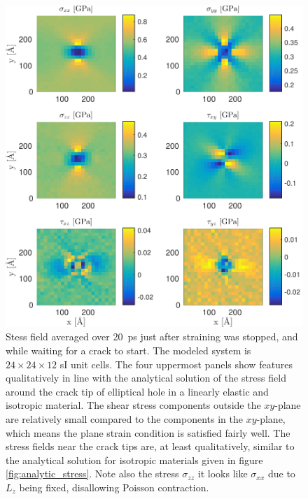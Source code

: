 \begin{figure}
\centering
\includegraphics[width=\textwidth]{../figures/thesis/stressfield_avg_wait_for_crack.pdf}
\caption{Stess field averaged over \SI{20}{\pico\second} just after straining was stopped, and while waiting for a crack to start. The modeled system is $24\times 24\times 12$ sI unit cells. The four uppermost panels show features qualitatively in line with the analytical solution of the stress field around the crack tip of elliptical hole in a linearly elastic and isotropic material. The shear stress components outside the $xy$-plane are relatively small compared to the components in the $xy$-plane, which means the plane strain condition is satisfied fairly well. The stress fields near the crack tips are, at least qualitatively, similar to the analytical solution for isotropic materials given in figure \ref{fig:analytic_stress}. Note also the stress $\sigma_{zz}$ it looks like $\sigma_{xx}$ due to $L_z$ being fixed, disallowing Poisson contraction.}
\label{fig:stressfield_avg_wait_for_crack}
\end{figure}


